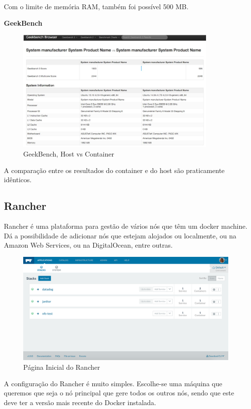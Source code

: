 \documentclass[pdftex,12pt,a4paper]{report}
\begin{document}
Com o limite de memória RAM, também foi possível 500 MB.

\textbf{GeekBench}

\begin{figure}[!htb]
\center
 \includegraphics[width=100mm,scale=1]{imagens/geekbench.png}
 \caption{GeekBench, Host vs Container}
 \label{fig:geekbench}
\end{figure}

A comparação entre os resultados do container e do host são praticamente idênticos.

\subsection{Rancher}

Rancher é uma plataforma para gestão de vários nós que têm um docker machine. Dá a possibilidade de adicionar nós que estejam alojados ou localmente, ou na Amazon Web Services, ou na DigitalOcean, entre outras.

\begin{figure}[!htb]
\center
 \includegraphics[width=150mm,scale=1]{imagens/rancher_intro.png}
 \caption{Página Inicial do Rancher}
 \label{fig:rancher_intro}
\end{figure}

A configuração do Rancher é muito simples. Escolhe-se uma máquina que queremos que seja o nó principal que gere todos os outros nós, sendo que este deve ter a versão mais recente do Docker instalada.
\end{document}
